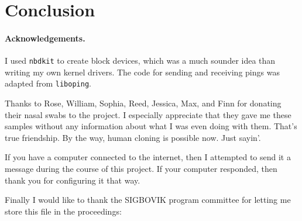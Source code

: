 \documentclass[twocolumn]{article}
\begin{document}
\section{Conclusion}

\paragraph{Acknowledgements.}

I used {\tt nbdkit} to create block devices, which was a much sounder
idea than writing my own kernel drivers. The code for sending and
receiving pings was adapted from {\tt liboping}.

Thanks to Rose, William, Sophia, Reed, Jessica, Max, and Finn for
donating their nasal swabs to the project. I especially appreciate
that they gave me these samples without any information about what I
was even doing with them. That's true friendship. By the way, human
cloning is possible now. Just sayin'.

If you have a computer connected to the internet, then I attempted
to send it a message during the course of this project. If your
computer responded, then thank you for configuring it that way.

Finally I would like to thank the SIGBOVIK program committee for letting
me store this file in the proceedings:

%

\end{document}
